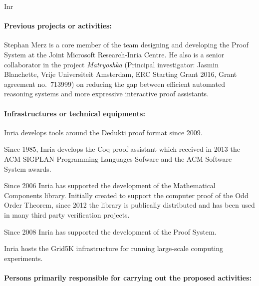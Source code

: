 \begin{sitedescription}{Inr}
\paragraph*{Previous projects or activities:}


\begin{compactitem}
\item Stephan Merz is a core member of the team designing and developing the \tlaplus Proof System at the Joint Microsoft Research-Inria Centre. He also is a senior collaborator in the project \emph{Matryoshka} (Principal investigator: Jasmin Blanchette, Vrije Universiteit Amsterdam, ERC Starting Grant 2016, Grant agreement no.\ 713999) on reducing the gap between efficient automated reasoning systems and more expressive interactive proof assistants.
\end{compactitem}

\paragraph*{Infrastructures or technical equipments:}


\begin{compactitem}
\item Inria develops tools around the Dedukti proof format since 2009.
\item Since 1985, Inria develops the Coq proof assistant which
  received in 2013 the ACM SIGPLAN Programming Languages Sofware and
  the ACM Software System awards.
\item Since 2006 Inria has supported the development of the Mathematical Components
  library. Initially created to support the computer proof of
  the Odd Order Theorem, since 2012 the library is publically distributed
  and has been used in many third party verification projects.
\item Since 2008 Inria has supported the development of the \tlaplus Proof System.
\item Inria hosts the Grid5K infrastructure for running large-scale computing experiments.
\end{compactitem}

\paragraph*{Persons primarily responsible for carrying out the proposed activities:}


\end{sitedescription}
